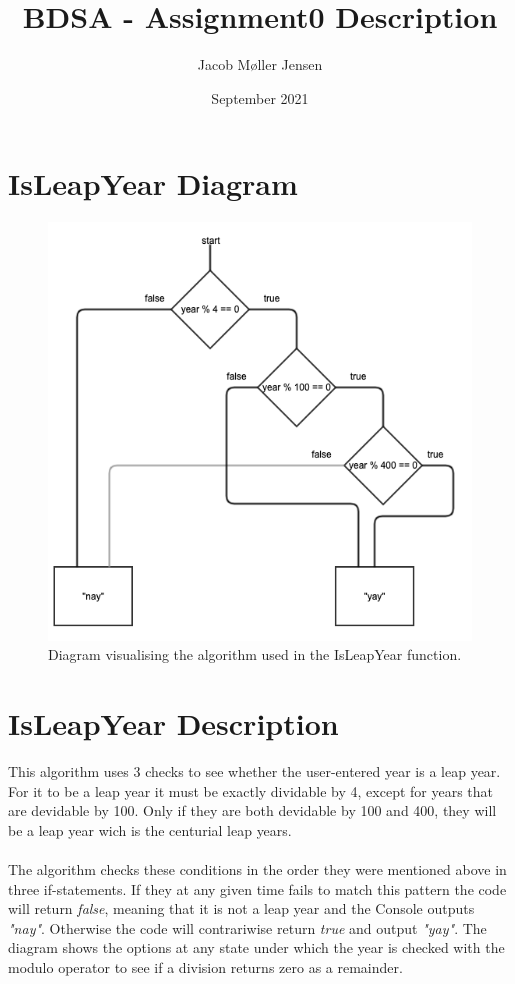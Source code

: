 \documentclass{article}
\title{BDSA - Assignment0 Description}
\author{Jacob Møller Jensen}
\date{September 2021}
\begin{document}
\maketitle

\section*{IsLeapYear Diagram}

\begin{figure}[h!]
\centering
\includegraphics[scale=0.5]{media/Assignment0diagram2}
\caption{Diagram visualising the algorithm used in the IsLeapYear function.}
\label{fig:media/Assignment0diagram2}
\end{figure}
\section*{IsLeapYear Description}
This algorithm uses 3 checks to see whether the user-entered year is a leap year. For it to be a leap year it must be exactly dividable by 4, except for years that are devidable by 100. Only if they are both devidable by 100 and 400, they will be a leap year wich is the centurial leap years. 
\\\\
The algorithm checks these conditions in the order they were mentioned above in three if-statements. If they at any given time fails to match this pattern the code will return \textit{false}, meaning that it is not a leap year and the Console outputs \textit{"nay"}. Otherwise the code will contrariwise return \textit{true} and output \textit{"yay"}. The diagram shows the options at any state under which the year is checked with the modulo operator to see if a division returns zero as a remainder.
\end{document}
